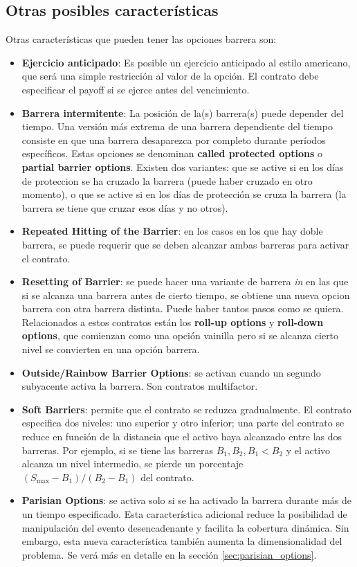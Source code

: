 \subsection{Otras posibles características}
Otras características que pueden tener las opciones barrera son:
\begin{itemize}
    \item \textbf{Ejercicio anticipado}: Es posible un ejercicio anticipado al estilo americano, que será una simple restricción al valor de la opción. El contrato debe especificar el payoff si se ejerce antes del vencimiento.
    \item \textbf{Barrera intermitente}: La posición de la(s) barrera(s) puede depender del tiempo. Una versión más extrema de una barrera dependiente del tiempo consiste en que una barrera desaparezca por completo durante períodos específicos. Estas opciones se denominan \textbf{called protected options} o \textbf{partial barrier options}. Existen dos variantes: que se active si en los días de proteccion se ha cruzado la barrera (puede haber cruzado en otro momento), o que se active si en los días de protección se cruza la barrera (la barrera se tiene que cruzar esos días y no otros).
    \item \textbf{Repeated Hitting of the Barrier}: en los casos en los que hay doble barrera, se puede requerir que se deben alcanzar ambas barreras para activar el contrato.
    \item \textbf{Resetting of Barrier}: se puede hacer una variante de barrera \textit{in} en las que si se alcanza una barrera antes de cierto tiempo, se obtiene una nueva opcion barrera con otra barrera distinta. Puede haber tantos pasos como se quiera. Relacionados a estos contratos están los \textbf{roll-up options} y \textbf{roll-down options}, que comienzan como una opción vainilla pero si se alcanza cierto nivel se convierten en una opción barrera.
    \item \textbf{Outside/Rainbow Barrier Options}: se activan cuando un segundo subyacente activa la barrera. Son contratos multifactor.
    \item \textbf{Soft Barriers}: permite que el contrato se reduzca gradualmente. El contrato especifica dos niveles: uno superior y otro inferior; una parte del contrato se reduce en función de la distancia que el activo haya alcanzado entre las dos barreras. Por ejemplo, si se tiene las barreras $B_1, B_2, B_1 < B_2$ y el activo alcanza un nivel intermedio, se pierde un porcentaje $(S_{\max}-B_1)/(B_2-B_1)$ del contrato.
    \item \textbf{Parisian Options}: se activa solo si se ha activado la barrera durante más de un tiempo especificado. Esta característica adicional reduce la posibilidad de manipulación del evento desencadenante y facilita la cobertura dinámica. Sin embargo, esta nueva característica también aumenta la dimensionalidad del problema. Se verá más en detalle en la sección \ref{sec:parisian_options}.

\end{itemize}
